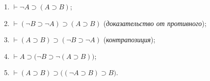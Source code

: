 \begin{lemma}\label{th:usefull_theorems}\leavevmode
    \begin{enumerate}[label=\arabic*)]
        \item $\vdash \neg A \supset (A \supset B)$;
        \item $\vdash (\neg B \supset \neg A) \supset (A \supset B)$ (\textit{доказательство от противного});
        \item\label{item:contraposition} $\vdash (A \supset B) \supset (\neg B \supset \neg A)$ (\textit{контрапозиция});
        \item $\vdash A \supset \big(\neg B \supset \neg(A \supset B)\big)$;
        \item $\vdash (A \supset B) \supset \big((\neg A \supset B) \supset B\big)$.
    \end{enumerate}
\end{lemma}
